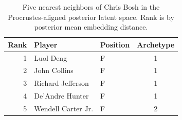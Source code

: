 \begin{table}[htbp]
  \centering\small
  \begin{tabular}{rllc}
    \toprule
    Rank & Player & Position & Archetype \\
    \midrule
    1 & Luol Deng & F & 1 \\
    2 & John Collins & F & 1 \\
    3 & Richard Jefferson & F & 1 \\
    4 & De'Andre Hunter & F & 1 \\
    5 & Wendell Carter Jr. & F & 2 \\
    \bottomrule
  \end{tabular}
  \caption{Five nearest neighbors of Chris Bosh in the Procrustes-aligned posterior latent space. Rank is by posterior mean embedding distance.}
  \label{tab:Chris_Bosh_neighbors}
\end{table}

